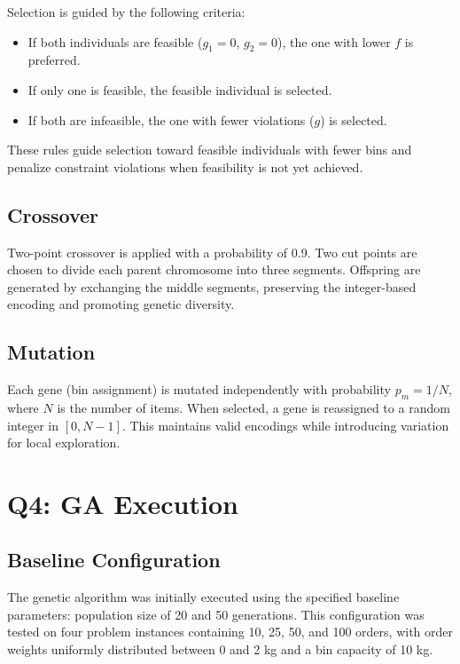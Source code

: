 \documentclass[journal,12pt,onecolumn]{IEEEtran}
\begin{document}
Selection is guided by the following criteria:
\begin{itemize}
    \item If both individuals are feasible ($g_1 = 0$, $g_2 = 0$), the one with lower $f$ is preferred.
    \item If only one is feasible, the feasible individual is selected.
    \item If both are infeasible, the one with fewer violations ($g$) is selected.
\end{itemize}

These rules guide selection toward feasible individuals with fewer bins and penalize constraint violations when feasibility is not yet achieved.

\subsection{Crossover}

Two-point crossover is applied with a probability of 0.9. Two cut points are chosen to divide each parent chromosome into three segments. Offspring are generated by exchanging the middle segments, preserving the integer-based encoding and promoting genetic diversity.

\subsection{Mutation}

Each gene (bin assignment) is mutated independently with probability $p_m = 1/N$, where $N$ is the number of items. When selected, a gene is reassigned to a random integer in $[0, N-1]$. This maintains valid encodings while introducing variation for local exploration.

\section{Q4: GA Execution}

\subsection{Baseline Configuration}

The genetic algorithm was initially executed using the specified baseline parameters: population size of 20 and 50 generations. This configuration was tested on four problem instances containing 10, 25, 50, and 100 orders, with order weights uniformly distributed between 0 and 2 kg and a bin capacity of 10 kg.
\end{document}
